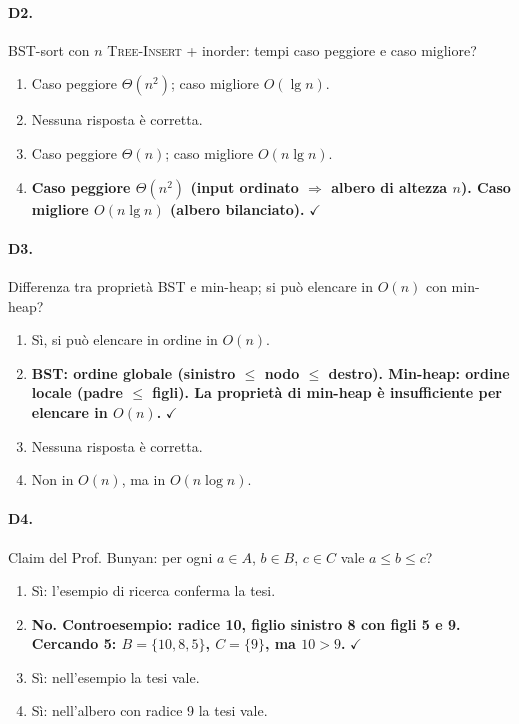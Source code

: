 \paragraph{D2.} BST-sort con $n$ \textsc{Tree-Insert} + inorder: tempi caso peggiore e caso migliore?
\begin{enumerate}[label=\Alph*.,leftmargin=*]
	\item Caso peggiore $\Theta(n^2)$; caso migliore $O(\lg n)$.
	\item Nessuna risposta \`e corretta.
	\item Caso peggiore $\Theta(n)$; caso migliore $O(n\lg n)$.
	\item \textcolor{correctgreen}{\textbf{Caso peggiore $\Theta(n^2)$ (input ordinato $\Rightarrow$ albero di altezza $n$). Caso migliore $O(n\lg n)$ (albero bilanciato).}} \hfill\textcolor{correctgreen}{$\checkmark$}
\end{enumerate}

\paragraph{D3.} Differenza tra propriet\`a BST e min-heap; si pu\`o elencare in $O(n)$ con min-heap?
\begin{enumerate}[label=\Alph*.,leftmargin=*]
	\item S\`i, si pu\`o elencare in ordine in $O(n)$.
	\item \textcolor{correctgreen}{\textbf{BST: ordine globale (sinistro $\le$ nodo $\le$ destro). Min-heap: ordine locale (padre $\le$ figli). La propriet\`a di min-heap \`e insufficiente per elencare in $O(n)$.}} \hfill\textcolor{correctgreen}{$\checkmark$}
	\item Nessuna risposta \`e corretta.
	\item Non in $O(n)$, ma in $O(n\log n)$.
\end{enumerate}

\paragraph{D4.} Claim del Prof. Bunyan: per ogni $a\in A$, $b\in B$, $c\in C$ vale $a\le b\le c$?
\begin{enumerate}[label=\Alph*.,leftmargin=*]
	\item S\`i: l'esempio di ricerca conferma la tesi.
	\item \textcolor{correctgreen}{\textbf{No. Controesempio: radice 10, figlio sinistro 8 con figli 5 e 9. Cercando 5: $B=\{10,8,5\}$, $C=\{9\}$, ma $10 > 9$.}} \hfill\textcolor{correctgreen}{$\checkmark$}
	\item S\`i: nell'esempio la tesi vale.
	\item S\`i: nell'albero con radice 9 la tesi vale.
\end{enumerate}

